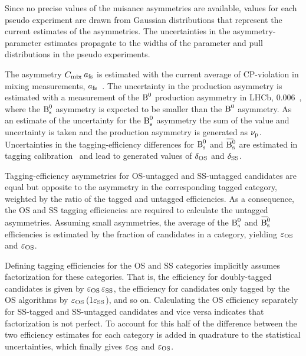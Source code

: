 Since no precise values of the nuisance asymmetries are available, values for each pseudo experiment are drawn from Gaussian distributions
that represent the current estimates of the asymmetries. The uncertainties in the asymmetry-parameter estimates propagate to the widths of
the parameter and pull distributions in the pseudo experiments.

The asymmetry $\Cm$\,$\afs$ is estimated with the current average of CP-violation in mixing measurements,
$\afs$\texteq{}~\cite{Amhis:2012bh}. The uncertainty in the production asymmetry is estimated with a measurement of
the $\Bd$ production asymmetry in LHCb, 0.006~\cite{LHCb-PAPER-2013-040}, where the $\Bs$ asymmetry is expected to be smaller
than the $\Bd$ asymmetry. As an estimate of the uncertainty for the $\Bs$ asymmetry the sum of the value and uncertainty is taken and the
production asymmetry is generated as $\AProd$. Uncertainties in the tagging-efficiency differences for $\Bs$ and
$\Bsbar$ are estimated in tagging calibration~\cite{LHCb-ANA-2014-039} and lead to generated values of
$\ATagEff[\text{OS}]$ and $\ATagEff[\text{SS}]$.

Tagging-efficiency asymmetries for OS-untagged and SS-untagged candidates are equal but opposite to the asymmetry in the corresponding
tagged category, weighted by the ratio of the tagged and untagged efficiencies. As a consequence, the OS and SS tagging efficiencies are
required to calculate the untagged asymmetries. Assuming small asymmetries, the average of the $\Bs$ and $\Bsbar$ efficiencies is estimated
by the fraction of candidates in a category, yielding $\tagCatCoef[\text{OS}]$ and
$\tagCatCoef[\text{OS}]$.

Defining tagging efficiencies for the OS and SS categories implicitly assumes factorization for these categories.  That is, the efficiency
for doubly-tagged candidates is given by $\tagCatCoef[\text{OS}]\,\tagCatCoef[\text{SS}]$, the efficiency for candidates only tagged by the
OS algorithms by $\tagCatCoef[\text{OS}]$\,(1\textminus$\tagCatCoef[\text{SS}]$), and so on. Calculating the OS efficiency separately for
SS-tagged and SS-untagged candidates and vice versa indicates that factorization is not perfect. To account for this half of the difference
between the two efficiency estimates for each category is added in quadrature to the statistical uncertainties, which finally gives
$\tagCatCoef[\text{OS}]$ and $\tagCatCoef[\text{OS}]$.

